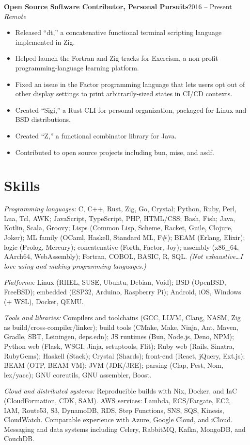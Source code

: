 \documentclass[11pt,letterpaper]{article}
\newcommand{\role}[4]{%
  \vspace{0.4em}%
  \noindent\textbf{#1, #2}\hfill{#4}\\
  \textit{#3}\par\vspace{0.05em}%
}
\begin{document}
\role{Open Source Software Contributor}{Personal Pursuits}{Remote}{2016 -- Present}
\begin{itemize}
  \item Released ``dt,'' a concatenative functional terminal scripting language implemented in Zig.
  \item Helped launch the Fortran and Zig tracks for Exercism, a non-profit programming-language learning platform.
  \item Fixed an issue in the Factor programming language that lets users opt out of other display settings to print arbitrarily-sized states in CI/CD contexts.
  \item Created ``Sigi,'' a Rust CLI for personal organization, packaged for Linux and BSD distributions.
  \item Created ``Z,'' a functional combinator library for Java.
  \item Contributed to open source projects including bun, mise, and asdf.
\end{itemize}

\section*{Skills}

\textit{Programming languages:} C, C++, Rust, Zig, Go, Crystal; Python, Ruby, Perl, Lua, Tcl, AWK; JavaScript, TypeScript, PHP, HTML/CSS; Bash, Fish; Java, Kotlin, Scala, Groovy; Lisps (Common Lisp, Scheme, Racket, Guile, Clojure, Joker); ML family (OCaml, Haskell, Standard ML, F\#); BEAM (Erlang, Elixir); logic (Prolog, Mercury); concatenative (Forth, Factor, Joy); assembly (x86\_64, AArch64, WebAssembly); Fortran, COBOL, BASIC, R, SQL. \textit{(Not exhaustive\ldots I love using and making programming languages.)}

\textit{Platforms:} Linux (RHEL, SUSE, Ubuntu, Debian, Void); BSD (OpenBSD, FreeBSD); embedded (ESP32, Arduino, Raspberry Pi); Android, iOS, Windows (+ WSL), Docker, QEMU.

\textit{Tools and libraries:} Compilers and toolchains (GCC, LLVM, Clang, NASM, Zig as build/cross-compiler/linker); build tools (CMake, Make, Ninja, Ant, Maven, Gradle, SBT, Leiningen, deps.edn); JS runtimes (Bun, Node.js, Deno, NPM); Python web (Flask, WSGI, Jinja, setuptools, Flit); Ruby web (Rails, Sinatra, RubyGems); Haskell (Stack); Crystal (Shards); front-end (React, jQuery, Ext.js); BEAM (OTP, BEAM VM); JVM (JDK/JRE); parsing (Clap, Pest, Nom, lex/yacc); GNU coreutils, GNU assembler, Boost.

\textit{Cloud and distributed systems:} Reproducible builds with Nix, Docker, and IaC (CloudFormation, CDK, SAM). AWS services: Lambda, ECS/Fargate, EC2, IAM, Route53, S3, DynamoDB, RDS, Step Functions, SNS, SQS, Kinesis, CloudWatch. Comparable experience with Azure, Google Cloud, and iCloud. Messaging and data systems including Celery, RabbitMQ, Kafka, MongoDB, and CouchDB.
\end{document}

